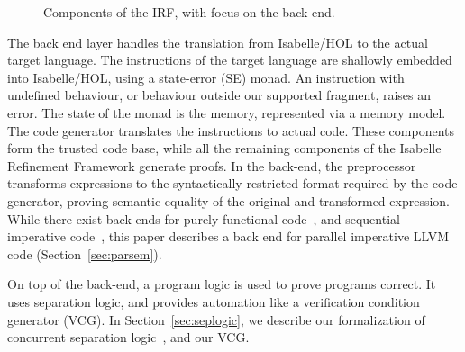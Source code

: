 \documentclass[sn-mathphys,Numbered]{sn-jnl}
\theoremstyle{thmstyleone}%
\theoremstyle{definition}%
\theoremstyle{thmstylethree}%
\begin{document}
\begin{figure}

  \caption{Components of the IRF, with focus on the back end.}\label{fig:IRF-overview}
\end{figure}
%
The back end layer handles the translation from Isabelle/HOL to the actual target language.
The instructions of the target language are shallowly embedded into Isabelle/HOL, using
a state-error (SE) monad. An instruction with undefined behaviour,
or behaviour outside our supported fragment, raises an error.
The state of the monad is the memory, represented via a memory model.
The code generator translates the instructions to actual code.
These components form the trusted code base, while all the remaining components of the
Isabelle Refinement Framework generate proofs. In the back-end, the preprocessor transforms
expressions to the syntactically restricted format required by the code generator,
proving semantic equality of the original and transformed expression.
While there exist back ends for purely functional code~\cite{LaTu12,La13},
and sequential imperative code~\cite{La15,La19-llvm}, this paper describes a back end
for parallel imperative LLVM code (Section~\ref{sec:parsem}).

On top of the back-end, a program logic is used to prove programs correct.
It uses separation logic, and provides automation like a verification condition generator (VCG).
In Section~\ref{sec:seplogic}, we describe our formalization of concurrent separation logic~\cite{OH04}, and our VCG.
\end{document}
